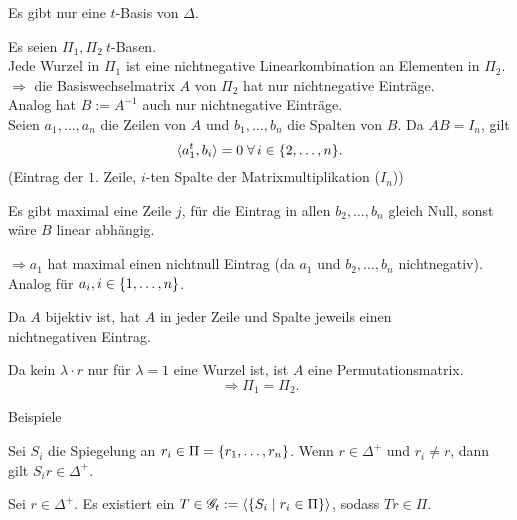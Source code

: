 \documentclass[12pt]{extarticle}
\begin{document}
\begin{satz} %
    Es gibt nur eine \( t \)-Basis von \( \Delta \).
\end{satz}
\begin{bew}
    Es seien \( \Pi_1, \Pi_2\ t \)-Basen.\\
    Jede Wurzel in \( \Pi_1 \) ist eine nichtnegative 
    Linearkombination an Elementen in \( \Pi_2 \).\\
    \( \Rightarrow \) die Basiswechselmatrix \(A\) von 
    \( \Pi_2 \) hat nur nichtnegative Einträge.\\
    Analog hat \( B := A^{-1} \) auch nur nichtnegative 
    Einträge. \\
    Seien \( a_1, \ldots, a_n \) die Zeilen von \(A\) 
    und \( b_1, \ldots, b_n \) die Spalten von \(B\).
    Da \( AB = I_n \), gilt 
    \[ \scalarprod{a_1^t}{b_i} = 0 \;\forall i \in \set{2, \ldots, n}. \]
    (Eintrag der \( 1 \). Zeile, \( i \)-ten Spalte der Matrixmultiplikation (\( I_n \)))

    Es gibt maximal eine Zeile \( j \), für die Eintrag in allen 
    \( b_2, \ldots, b_n \) gleich Null, sonst wäre 
    \(B\) linear abhängig.

    \( \Rightarrow a_1 \) hat maximal einen 
    nichtnull Eintrag (da \(a_1\) und \( b_2, \ldots, b_n \) nichtnegativ).\\
    Analog für \( a_i, i \in \{1, \ldots, n\} \).

    Da \(A\) bijektiv ist, hat \(A\) in jeder Zeile und 
    Spalte jeweils einen \\
    nichtnegativen Eintrag.

    Da kein \( \lambda \cdot r \) nur für 
    \( \lambda = 1 \) eine Wurzel ist, 
    ist \( A \) eine Permutationsmatrix.
    \[ \Rightarrow \Pi_1 = \Pi_2. \]
\end{bew}

Beispiele

\begin{satz} %
    Sei \( S_i \) die Spiegelung an 
    \( r_i \in \Pi = \{r_1, \ldots, r_n\} \).
    Wenn \( r \in \Delta^+ \) und \( r_i \neq r \), 
    dann gilt \( S_i r \in \Delta^+ \).
\end{satz}

\begin{satz} %
    Sei \( r \in \Delta^+ \). Es existiert ein \( T \in 
    \mathscr{G}_t := \langle 
    \{S_i \;\vert\; r_i \in \Pi\} \rangle \), sodass 
    \( Tr \in \Pi \).
\end{satz}
\end{document}
